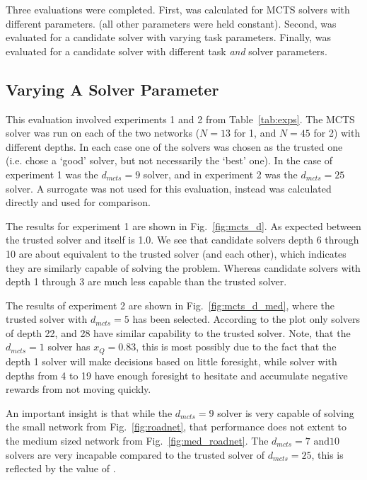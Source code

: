Three evaluations were completed. First, \xQ{} was calculated for MCTS solvers with different parameters. (all other parameters were held constant). Second, \xQ{} was evaluated for a candidate solver with varying task parameters. Finally, \xQ{} was evaluated for a candidate solver with different task \emph{and} solver parameters.

\subsection{Varying A Solver Parameter}
This evaluation involved experiments 1 and 2 from Table~\ref{tab:exps}. The MCTS solver was run on each of the two networks ($N=13$ for 1, and $N=45$ for 2) with different depths. In each case one of the solvers was chosen as the trusted one (i.e. chose a `good' solver, but not necessarily the `best' one). In the case of experiment 1 \solvestar{} was the $d_{mcts}=9$ solver, and in experiment 2 \solvestar{} was the $d_{mcts}=25$ solver. A surrogate \surrogate{} was not used for this evaluation, instead \rwdstar{} was calculated directly and used for comparison.

The results for experiment 1 are shown in Fig.~\ref{fig:mcts_d}. As expected \xQ{} between the trusted solver and itself is 1.0. We see that candidate solvers depth 6 through 10 are about equivalent to the trusted solver (and each other), which indicates they are similarly capable of solving the problem. Whereas candidate solvers with depth 1 through 3 are much less capable than the trusted solver.

The results of experiment 2 are shown in Fig.~\ref{fig:mcts_d_med}, where the trusted solver with $d_{mcts}=5$ has been selected. According to the plot only solvers of depth 22, and 28 have similar capability to the trusted solver. Note, that the $d_{mcts}=1$ solver has $x_Q=0.83$, this is most possibly due to the fact that the depth 1 solver will make decisions based on little foresight, while solver with depths from 4 to 19 have enough foresight to hesitate and accumulate negative rewards from not moving quickly.

An important insight is that while the $d_{mcts}=9$ solver is very capable of solving the small network from Fig.~\ref{fig:roadnet}, that performance does not extent to the medium sized network from Fig.~\ref{fig:med_roadnet}. The $d_{mcts}=7 \text{ and} 10$ solvers are very incapable compared to the trusted solver of $d_{mcts}=25$, this is reflected by the value of \xQ.

